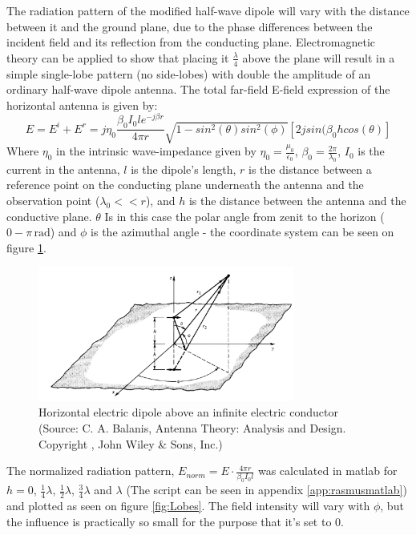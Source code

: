 The radiation pattern of the modified half-wave dipole will vary with the distance between it and the ground plane, due to the phase differences between the incident field and its reflection from the conducting plane. Electromagnetic theory can be applied to show that placing it $\frac{\lambda}{4}$ above the plane will result in a simple single-lobe pattern (no side-lobes) with double the amplitude of an ordinary half-wave dipole antenna. The total far-field E-field expression of the horizontal antenna is given by:
\begin{equation}
E=E^i+E^r=j\eta_0 \frac{\beta_0 I_0 l e^{-j\beta r}}{4\pi r}\sqrt{1-sin^2(\theta)sin^2(\phi)}[2jsin(\beta_0 h cos(\theta)]
\end{equation}
Where $\eta_0$ in the intrinsic wave-impedance given by $\eta_0=\frac{\mu_0}{\epsilon_0}$, $\beta_0=\frac{2\pi}{\lambda_0}$, $I_0$ is the current in the antenna, $l$ is the dipole's length, $r$ is the distance between a reference point on the conducting plane underneath the antenna and the observation point ($\lambda_0<<r$), and $h$ is the distance between the antenna and the conductive plane. $\theta$ Is in this case the polar angle from zenit to the horizon ($0-\pi\,\mathrm{rad}$) and $\phi$ is the azimuthal angle - the coordinate system can be seen on figure \ref{fig:reflect}. 
\begin{figure}[!htb]
	\centering
	\includegraphics[width=0.75\textwidth]{figures/Rasmus/reflectCoord}
	\caption{Horizontal electric dipole above an infinite electric conductor (Source: C. A. Balanis, Antenna Theory: Analysis and Design. Copyright , John Wiley \& Sons, Inc.)
	\label{fig:reflect}}
\end{figure}
The normalized radiation pattern, $E_{norm}=E\cdot \frac{4\pi r}{\beta_0 I_0 l}$ was calculated in matlab for $h=0$, $\frac{1}{4}\lambda$, $\frac{1}{2}\lambda$, $\frac{3}{4}\lambda$ and $\lambda$ (The script can be seen in appendix \ref{app:rasmusmatlab}) and plotted as seen on figure \ref{fig:Lobes}. The field intensity will vary with $\phi$, but the influence is practically so small for the purpose that it's set to 0.  

